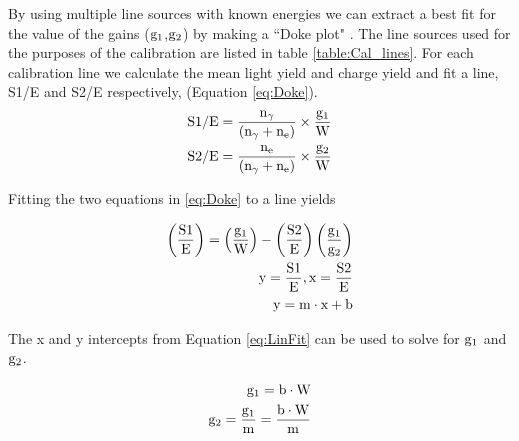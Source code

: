 By using multiple line sources with known energies we can extract a best fit for the value of the gains ($\rm g_1$,$\rm g_2$) by making a ``Doke plot" \cite{Doke_alpha} \cite{alpha_xenon}. The line sources used for the purposes of the calibration are listed in table \ref{table:Cal_lines}. For each calibration line we calculate the mean light yield and charge yield and fit a line, S1/E and S2/E respectively, (Equation \ref{eq:Doke}).
\begin{equation}
\begin{split}
\rm  S1/E= \frac{n_\gamma}{(n_\gamma+n_e)}\times\frac{g_1}{W} \\
\rm  S2/E= \frac{n_e}{(n_\gamma+n_e)}\times\frac{g_2}{W}
\label{eq:Doke}
\end{split}
\end{equation}

\noindent Fitting the two equations in \ref{eq:Doke} to a line yields

\begin{equation}
\begin{split}
\rm  \left(\frac{S1}{E}\right)=\left(\frac{g_1}{W}\right) - \left(\frac{S2}{E}\right)\left(\frac{g_1}{g_2}\right) \\
\rm y=\frac{S1}{E}, x=\frac{S2}{E} \\
\rm y= m\cdot x + b
\label{eq:LinFit}
\end{split}
\end{equation}

\noindent The x and y intercepts from Equation \ref{eq:LinFit} can be used to solve for $\rm g_1$ and $\rm g_2$. 

\begin{equation}
\begin{split}
\rm g_1=b\cdot W \\
\rm g_2=\frac{g_1}{m}=\frac{b\cdot W}{m}
\label{eq:g1g2_linfit}
\end{split}
\end{equation}


